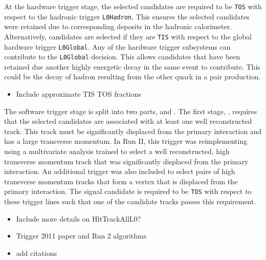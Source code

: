 At the hardware trigger stage, the selected candidates are required to be \texttt{TOS} with respect to the hadronic trigger \texttt{L0Hadron}. This ensures the selected candidates were retained due to corresponding deposits in the hadronic calorimeter. Alternatively, candidates are selected if they are \texttt{TIS} with respect to the global hardware trigger \texttt{L0Global}. Any of the hardware trigger subsystems can contribute to the \texttt{L0Global} decision. This allows candidates that have been retained due another highly energetic decay in the same event to contribute. This could be the decay of hadron resulting from the other \bquark quark in a \bquark\bquarkbar pair production. 

{\color{Red}
\begin{itemize}
\item Include approximate TIS TOS fractions
\end{itemize}
}


The software trigger stage is split into two parts, \hltone and \hlttwo.
The first stage, \hltone, requires that the selected candidates are associated with at least one well reconstructed track. This track must be significantly displaced from the primary interaction and has a large transverse momentum. In Run II, this trigger was reimplementing using a multivariate analysis trained to select a well reconstructed, high transverse momentum track that was significantly displaced from the primary interaction. An additional trigger was also included to select pairs of high transverse momentum tracks that form a vertex that is displaced from the primary interaction. The signal candidate is required to be \texttt{TOS} with respect to these trigger lines such that one of the candidate tracks passes this requirement.   

{\color{Red}
\begin{itemize}
\item Include more details on HltTrackAllL0? 
\item Trigger 2011 paper and Run 2 algorithms
\item add citations
\end{itemize}
}



